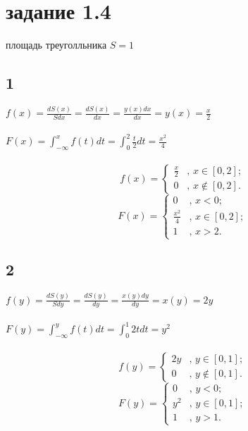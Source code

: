 \documentclass[a4paper]{article}
\begin{document}
	\section*{задание 1.4}
	\begin{large}
		площадь треуголльника $S = 1$\\
		\subsection*{1}
		$f(x) = \frac{dS(x)}{Sdx} = \frac{dS(x)}{dx} = \frac{y(x)dx}{dx} = y(x) = \frac{x}{2}$\\
		\\
		$F(x) = \int_{-\infty}^{x} f(t) dt = \int_{0}^{2} \frac{t}{2} dt = \frac{x^2}{4}$\\
		\\
		\[ f(x) = \left\{ \begin{array}{ll}
			\frac{x}{2} & \mbox{, $x \in [0, 2]$};\\
			0 & \mbox{, $x \notin [0, 2]$}.\end{array} \right. \]
		\[ F(x) = \left\{ \begin{array}{ll}
			0 & \mbox{, $x<0$};\\
			\frac{x^2}{4} & \mbox{, $x \in [0, 2]$};\\
			1 & \mbox{, $x>2$}.\end{array} \right. \]
		\subsection*{2}
		$f(y) = \frac{dS(y)}{Sdy} = \frac{dS(y)}{dy} = \frac{x(y)dy}{dy} = x(y) = 2y$\\
		\\
		$F(y) = \int_{-\infty}^{y} f(t) dt = \int_{0}^{1} 2t dt = y^2$\\
		\\
		\[ f(y) = \left\{ \begin{array}{ll}
			2y & \mbox{, $y \in [0, 1]$};\\
			0 & \mbox{, $y \notin [0, 1]$}.\end{array} \right. \]
		\[ F(y) = \left\{ \begin{array}{ll}
			0 & \mbox{, $y<0$};\\
			y^2 & \mbox{, $y \in [0, 1]$};\\
			1 & \mbox{, $y>1$}.\end{array} \right. \]
	\end{large}
\end{document}
